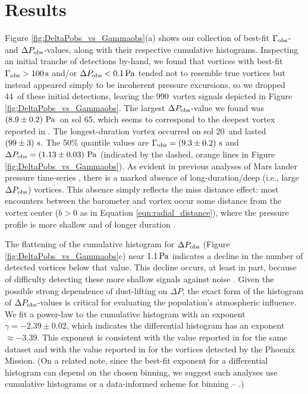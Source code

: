 \documentclass{aastex63}
\newcommand{\totalvortices}{990}
\newcommand{\maskedvortices}{44}
\newcommand{\largestDeltaPobs}{$\left( 8.9 \pm 0.2 \right)\,{\rm Pa}$}
\newcommand{\largestDeltaPobssol}{65}
\newcommand{\largestGammaobssol}{20}
\newcommand{\largestGammaobs}{$\left( 99 \pm 3 \right)\,{\rm s}$}
\begin{document}
\section{Results}
\label{sec:Results}
Figure \ref{fig:DeltaPobs_vs_Gammaobs}(a) shows our collection of best-fit $\Gamma_{\rm obs}$- and $\Delta P_{\rm obs}$-values, along with their respective cumulative histograms. Inspecting an initial tranche of detections by-hand, we found that vortices with best-fit $\Gamma_{\rm obs} > 100\,{\rm s}$ and/or $\Delta P_{\rm obs} < 0.1\,{\rm Pa}$ tended not to resemble true vortices but instead appeared simply to be incoherent pressure excursions, so we dropped \maskedvortices\ of these initial detections, leaving the \totalvortices\ vortex signals depicted in Figure \ref{fig:DeltaPobs_vs_Gammaobs}. The largest $\Delta P_{\rm obs}$-value we found was \largestDeltaPobs\ on sol \largestDeltaPobssol, which seems to correspond to the deepest vortex reported in \citet{2020arXiv200501134S}. The longest-duration vortex occurred on sol \largestGammaobssol\ and lasted \largestGammaobs. The 50\% quantile values are $\Gamma_{\rm obs} = \left( 9.3 \pm 0.2 \right)\,{\rm s}$ and $\Delta P_{\rm obs} = \left( 1.13 \pm 0.03 \right)\,{\rm Pa}$ (indicated by the dashed, orange lines in Figure \ref{fig:DeltaPobs_vs_Gammaobs}). As evident in previous analyses of Mars lander pressure time-series \citep[e.g.,][]{2010JGRE..115.0E16E}, there is a marked absence of long-duration/deep (i.e., large $\Delta P_{\rm obs}$) vortices. This absence simply reflects the miss distance effect: most encounters between the barometer and vortex occur some distance from the vortex center ($b > 0$ as in Equation \ref{eqn:radial_distance}), where the pressure profile is more shallow and of longer duration \citep{2018Icar..299..166J}.

The flattening of the cumulative histogram for $\Delta P_{\rm obs}$ (Figure \ref{fig:DeltaPobs_vs_Gammaobs}c) near $1.1\,{\rm Pa}$ indicates a decline in the number of detected vortices below that value. This decline occurs, at least in part, because of difficulty detecting these more shallow signals against noise \citep{2018Icar..299..166J}. Given the possible strong dependence of dust-lifting on $\Delta P$, the exact form of the histogram of $\Delta P_{\rm obs}$-values is critical for evaluating the population's atmospheric influence. We fit a power-law to the cumulative histogram with an exponent $\gamma = -2.39\pm0.02$, which indicates the differential histogram has an exponent $\approx -3.39$. This exponent is consistent with the value reported in \citet{2020arXiv200501134S} for the same dataset and with the value reported in \citet{2018Icar..299..166J} for the vortices detected by the Phoenix Mission. (On a related note, since the best-fit exponent for a differential histogram can depend on the chosen binning, we suggest such analyses use cumulative histograms or a data-informed scheme for binning -- \citealp{2016SSRv..203..277L}.)
\end{document}
